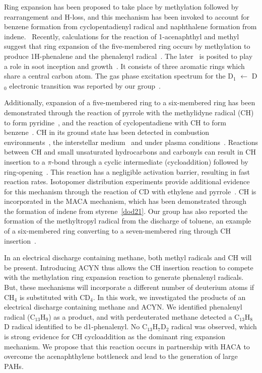 \documentclass[journal=jacsat,manuscript=article,layout=onecolumn]{achemso}
\begin{document}
Ring expansion has been proposed to take place by methylation followed by rearrangement and H-loss, and this mechanism has been invoked to account for benzene formation from cyclopentadienyl radical and naphthalene formation from indene.~\cite{mel96,mos96,sha09,meb16,jas13,zha19,meb17} Recently, calculations for the reaction of 1-acenaphthyl and methyl suggest that ring expansion of the five-membered ring occurs by methylation to produce 1H-phenalene and the phenalenyl radical~\cite{por20}. The later~\cite{mor11,oco17} is posited to play a role in soot inception and growth~\cite{joh18}. It consists of three aromatic rings which share a central carbon atom. The gas phase excitation spectrum for the D$_1$ $\leftarrow$ D$_0$ electronic transition was reported by our group~\cite{oco11}.

Additionally, expansion of a five-membered ring to a six-membered ring has been demonstrated through the reaction of pyrrole with the methylidyne radical (CH) to form pyridine~\cite{soo10}, and the reaction of cyclopentadiene with CH to form benzene~\cite{cas19}. CH in its ground state has been detected in combustion environments~\cite{lov11,tin11,zha12}, the interstellar medium~\cite{ger10,ada41} and under plasma conditions~\cite{zho06}. Reactions between CH and small unsaturated hydrocarbons and carbonyls can result in CH insertion to a $\pi$-bond through a cyclic intermediate (cycloaddition) followed by ring-opening~\cite{gou09,tre13,gou12,tre16,cas19}. This reaction has a negligible activation barrier, resulting in fast reaction rates. Isotopomer distribution experiments provide additional evidence for this mechanism through the reaction of CD with ethylene and pyrrole~\cite{gou09,soo10}. CH is incorporated in the MACA mechanism, which has been demonstrated through the formation of indene from styrene~\ref{dod21}. Our group has also reported the formation of the methyltropyl radical from the discharge of toluene, an example of a six-membered ring converting to a seven-membered ring through CH insertion~\cite{rei18}. %

In an electrical discharge containing methane, both methyl radicals and CH will be present. Introducing ACYN thus allows the CH insertion reaction to compete with the methylation ring expansion reaction to generate phenalenyl radicals. But, these mechanisms will incorporate a different number of deuterium atoms if CH$_4$ is substituted with CD$_4$. In this work, we investigated the products of an electrical discharge containing methane and ACYN. We identified phenalenyl radical (C$_{13}$H$_9$) as a product, and with perdeuterated methane detected a C$_{13}$H$_8$D radical identified to be d1-phenalenyl. No C$_{13}$H$_7$D$_2$ radical was observed, which is strong evidence for CH cycloaddition as the dominant ring expansion mechanism. We propose that this reaction occurs in partnership with HACA to overcome the acenaphthylene bottleneck and lead to the generation of large PAHs.
\end{document}
